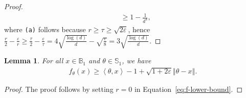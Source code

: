 \documentclass[letter, 12pt]{report}
\newcommand{\ip}[1]{\left \langle #1 \right \rangle}
\newcommand{\paren}[1]{\left( #1 \right)}
\newcommand{\norm}[1]{\left \Vert  #1 \right \Vert}
\newcommand{\bS}{\mathbb S}
\newcommand{\1}{\mathbf{1}}
\renewcommand{\epsilon}{\varepsilon}
\theoremstyle{plain}
\newtheorem{lemma}[theorem]{Lemma}
\theoremstyle{definition}
\theoremstyle{remark}
\begin{document}
\begin{proof}
\begin{align*}
         & \geq
        1 - \frac{1}{d^4}
        ,
    \end{align*}
    where \texttt{(a)} follows because
    $r \geq \tau \geq \sqrt{2\epsilon}$,
    hence $\tfrac{r}{2} - \tfrac{\epsilon}{r} \geq
        \tfrac{\tau}{2} - \tfrac{\epsilon}{\tau} = 4 \sqrt{\tfrac{\log(d)}{d}} - \sqrt{\tfrac{\epsilon}{8}} = 3 \sqrt{\tfrac{\log(d)}{d}}$.
\end{proof}

\begin{lemma}\label{lem:f-lower-bound}
    For all $x \in \mathbb{B}_1$ and $\theta \in \bS_1$, we have
    \begin{align*}
        f_\theta(x) \geq \ip{\theta, x} - 1 + \sqrt{1 + 2\epsilon}\norm{\theta - x}.
    \end{align*}
\end{lemma}
\begin{proof}
    The proof follows by setting $r=0$ in Equation~\eqref{eq:f-lower-bound}.
\end{proof}
\end{document}
